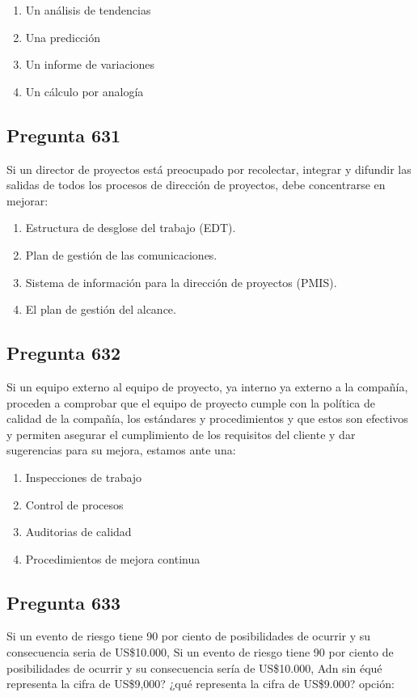 \documentclass[11pt,a4paper]{article}
\begin{document}
\begin{enumerate}[label=\alph*)]
  \item Un análisis de tendencias
  \item Una predicción
  \item Un informe de variaciones
  \item Un cálculo por analogía
\end{enumerate}

\subsection*{Pregunta 631}
Si un director de proyectos está preocupado por recolectar, integrar y difundir las salidas de todos los procesos de dirección de proyectos, debe concentrarse en mejorar:

\begin{enumerate}[label=\alph*)]
  \item Estructura de desglose del trabajo (EDT).
  \item Plan de gestión de las comunicaciones.
  \item Sistema de información para la dirección de proyectos (PMIS).
  \item El plan de gestión del alcance.
\end{enumerate}

\subsection*{Pregunta 632}
Si un equipo externo al equipo de proyecto, ya interno ya externo a la compañía, proceden a comprobar que el equipo de proyecto cumple con la política de calidad de la compañía, los estándares y procedimientos y que estos son efectivos y permiten asegurar el cumplimiento de los requisitos del cliente y dar sugerencias para su mejora, estamos ante una:

\begin{enumerate}[label=\alph*)]
  \item Inspecciones de trabajo
  \item Control de procesos
  \item Auditorias de calidad
  \item Procedimientos de mejora continua
\end{enumerate}

\subsection*{Pregunta 633}
Si un evento de riesgo tiene 90 por ciento de posibilidades de ocurrir y su consecuencia seria de US\$10.000, Si un evento de riesgo tiene 90 por ciento de posibilidades de ocurrir y su consecuencia sería de US\$10.000, Adn sin équé representa la cifra de US\$9,000? ¿qué representa la cifra de US\$9.000? opción:
\end{document}
